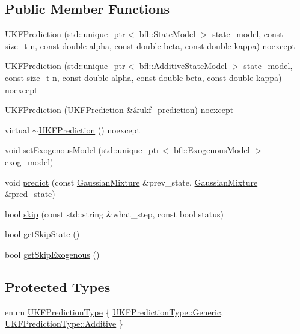 \subsection*{Public Member Functions}
\begin{DoxyCompactItemize}
\item 
\mbox{\hyperlink{classbfl_1_1UKFPrediction_a210e1d69d8a9235e13083a52be1012a3}{U\+K\+F\+Prediction}} (std\+::unique\+\_\+ptr$<$ \mbox{\hyperlink{classbfl_1_1StateModel}{bfl\+::\+State\+Model}} $>$ state\+\_\+model, const size\+\_\+t n, const double alpha, const double beta, const double kappa) noexcept
\item 
\mbox{\hyperlink{classbfl_1_1UKFPrediction_ac6bcd034d265cc5f865ec77f38b8701e}{U\+K\+F\+Prediction}} (std\+::unique\+\_\+ptr$<$ \mbox{\hyperlink{classbfl_1_1AdditiveStateModel}{bfl\+::\+Additive\+State\+Model}} $>$ state\+\_\+model, const size\+\_\+t n, const double alpha, const double beta, const double kappa) noexcept
\item 
\mbox{\hyperlink{classbfl_1_1UKFPrediction_a947f5b3f0b8ab7ef5943e31027fa6442}{U\+K\+F\+Prediction}} (\mbox{\hyperlink{classbfl_1_1UKFPrediction}{U\+K\+F\+Prediction}} \&\&ukf\+\_\+prediction) noexcept
\item 
virtual \mbox{\hyperlink{classbfl_1_1UKFPrediction_a1a61fe4056c93c0dbfa3ce66b37c96d5}{$\sim$\+U\+K\+F\+Prediction}} () noexcept
\item 
void \mbox{\hyperlink{classbfl_1_1UKFPrediction_a9d1beaa2cb50ca2e006c9a68f9a8499a}{set\+Exogenous\+Model}} (std\+::unique\+\_\+ptr$<$ \mbox{\hyperlink{classbfl_1_1ExogenousModel}{bfl\+::\+Exogenous\+Model}} $>$ exog\+\_\+model)
\item 
void \mbox{\hyperlink{classbfl_1_1GaussianPrediction_a37195b6f9a8799ac3d357500b8142676}{predict}} (const \mbox{\hyperlink{classbfl_1_1GaussianMixture}{Gaussian\+Mixture}} \&prev\+\_\+state, \mbox{\hyperlink{classbfl_1_1GaussianMixture}{Gaussian\+Mixture}} \&pred\+\_\+state)
\item 
bool \mbox{\hyperlink{classbfl_1_1GaussianPrediction_ae647821cf920ea81f981ebc9260cdbe6}{skip}} (const std\+::string \&what\+\_\+step, const bool status)
\item 
bool \mbox{\hyperlink{classbfl_1_1GaussianPrediction_a6885530a677199241b2ac11ccdb09688}{get\+Skip\+State}} ()
\item 
bool \mbox{\hyperlink{classbfl_1_1GaussianPrediction_aaf3743111a493b90092b7ead9cbf7825}{get\+Skip\+Exogenous}} ()
\end{DoxyCompactItemize}
\subsection*{Protected Types}
\begin{DoxyCompactItemize}
\item 
enum \mbox{\hyperlink{classbfl_1_1UKFPrediction_a122c74f8d8efa4d14f92abf82f96df68}{U\+K\+F\+Prediction\+Type}} \{ \mbox{\hyperlink{classbfl_1_1UKFPrediction_a122c74f8d8efa4d14f92abf82f96df68a8045a0a6c688b0635e3caccc408a1446}{U\+K\+F\+Prediction\+Type\+::\+Generic}}, 
\mbox{\hyperlink{classbfl_1_1UKFPrediction_a122c74f8d8efa4d14f92abf82f96df68a3f7b3d8ee7bf0d542bd50821c083888f}{U\+K\+F\+Prediction\+Type\+::\+Additive}}
 \}
\end{DoxyCompactItemize}
